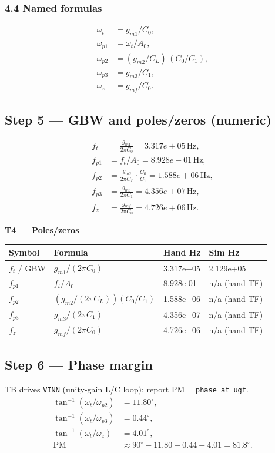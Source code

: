 \documentclass[11pt]{article}
\begin{document}
\subsubsection{4.4 Named formulas}
\begin{align*}
\omega_t &= g_{m1}/C_0,\\
\omega_{p1} &= \omega_t/A_0,\\
\omega_{p2} &= (g_{m2}/C_L)\,(C_0/C_1),\\
\omega_{p3} &= g_{m3}/C_1,\\
\omega_z &= g_{mf}/C_0.
\end{align*}

\subsection{Step 5 --- GBW and poles/zeros (numeric)}
\begin{align*}
f_t &= \frac{g_{m1}}{2\pi C_0} = 3.317e+05\,\mathrm{Hz},\\
f_{p1} &= f_t/A_0 = 8.928e-01\,\mathrm{Hz},\\
f_{p2} &= \frac{g_{m2}}{2\pi C_L}\cdot\frac{C_0}{C_1} = 1.588e+06\,\mathrm{Hz},\\
f_{p3} &= \frac{g_{m3}}{2\pi C_1} = 4.356e+07\,\mathrm{Hz},\\
f_z &= \frac{g_{mf}}{2\pi C_0} = 4.726e+06\,\mathrm{Hz}.
\end{align*}

\textbf{T4 --- Poles/zeros}
\begin{center}
{\small
\begin{tabular}{@{}llll@{}}
\toprule
Symbol & Formula & Hand Hz & Sim Hz \\
\midrule
$f_t$ / GBW & $g_{m1}/(2\pi C_0)$ & 3.317e+05 & 2.129e+05 \\
$f_{p1}$ & $f_t/A_0$ & 8.928e-01 & n/a (hand TF) \\
$f_{p2}$ & $(g_{m2}/(2\pi C_L))(C_0/C_1)$ & 1.588e+06 & n/a (hand TF) \\
$f_{p3}$ & $g_{m3}/(2\pi C_1)$ & 4.356e+07 & n/a (hand TF) \\
$f_z$ & $g_{mf}/(2\pi C_0)$ & 4.726e+06 & n/a (hand TF) \\
\bottomrule
\end{tabular}}
\end{center}

\subsection{Step 6 --- Phase margin}
TB drives \texttt{VINN} (unity-gain L/C loop); report $\mathrm{PM}{=}$\texttt{phase\_at\_ugf}.
\begin{align*}
\tan^{-1}(\omega_t/\omega_{p2}) &= 11.80^\circ,\\
\tan^{-1}(\omega_t/\omega_{p3}) &= 0.44^\circ,\\
\tan^{-1}(\omega_t/\omega_z) &= 4.01^\circ,\\
\mathrm{PM} &\approx 90^\circ - 11.80 - 0.44 + 4.01
  = 81.8^\circ.
\end{align*}
\end{document}
